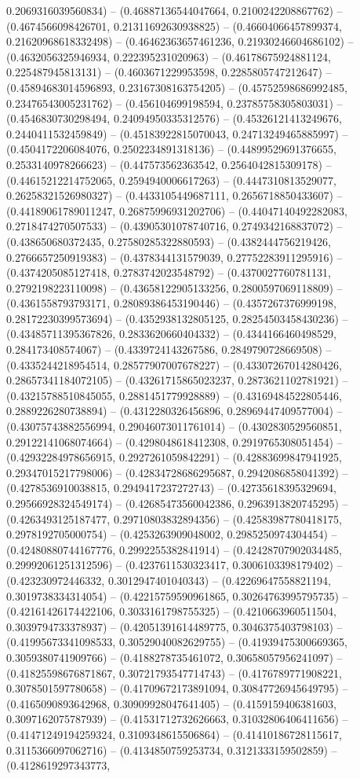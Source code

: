 0.2069316039560834) -- (0.46887136544047664, 0.2100242208867762) -- (0.4674566098426701, 0.21311692630938825) -- (0.46604066457899374, 0.21620968618332498) -- (0.46462363657461236, 0.21930246604686102) -- (0.4632056325946934, 0.222395231020963) -- (0.46178675924881124, 0.225487945813131) -- (0.4603671229953598, 0.2285805747212647) -- (0.45894683014596893, 0.23167308163754205) -- (0.45752598686992485, 0.23476543005231762) -- (0.456104699198594, 0.23785758305803031) -- (0.4546830730298494, 0.24094950335312576) -- (0.45326121413249676, 0.2440411532459849) -- (0.45183922815070043, 0.24713249465885997) -- (0.4504172206084076, 0.2502234891318136) -- (0.44899529691376655, 0.2533140978266623) -- (0.447573562363542, 0.2564042815309178) -- (0.44615212214752065, 0.2594940006617263) -- (0.4447310813529077, 0.26258321526980327) -- (0.4433105449687111, 0.2656718850433607) -- (0.44189061789011247, 0.26875996931202706) -- (0.44047140492282083, 0.2718474270507533) -- (0.43905301078740716, 0.2749342168837072) -- (0.438650680372435, 0.27580285322880593) -- (0.4382444756219426, 0.2766657250919383) -- (0.4378344131579039, 0.27752283911295916) -- (0.4374205085127418, 0.2783742023548792) -- (0.4370027760781131, 0.2792198223110098) -- (0.43658122905133256, 0.2800597069118809) -- (0.4361558793793171, 0.28089386453190446) -- (0.4357267376999198, 0.28172230399573694) -- (0.4352938132805125, 0.28254503458430236) -- (0.43485711395367826, 0.2833620660404332) -- (0.4344166460498529, 0.284173408574067) -- (0.4339724143267586, 0.2849790728669508) -- (0.4335244218954514, 0.28577907007678227) -- (0.43307267014280426, 0.28657341184072105) -- (0.43261715865023237, 0.2873621102781921) -- (0.43215788510845055, 0.2881451779928889) -- (0.43169484522805446, 0.2889226280738894) -- (0.4312280326456896, 0.28969447409577004) -- (0.43075743882556994, 0.29046073011761014) -- (0.4302830529560851, 0.29122141068074664) -- (0.4298048618412308, 0.2919765308051454) -- (0.42932284978656915, 0.2927261059842291) -- (0.42883699847941925, 0.29347015217798006) -- (0.42834728686295687, 0.2942086858041392) -- (0.4278536910038815, 0.2949417237272743) -- (0.42735618395329694, 0.29566928324549174) -- (0.42685473560042386, 0.2963913820745295) -- (0.4263493125187477, 0.29710803832894356) -- (0.42583987780418175, 0.2978192705000754) -- (0.4253263909048002, 0.2985250974304454) -- (0.42480880744167776, 0.2992255382841914) -- (0.42428707902034485, 0.29992061251312596) -- (0.4237611530323417, 0.3006103398179402) -- (0.423230972446332, 0.3012947401040343) -- (0.42269647558821194, 0.3019738334314054) -- (0.42215759590961865, 0.30264763995795735) -- (0.42161426174422106, 0.3033161798755325) -- (0.4210663960511504, 0.3039794733378937) -- (0.42051391614489775, 0.3046375403798103) -- (0.41995673341098533, 0.30529040082629755) -- (0.41939475300669365, 0.3059380741909766) -- (0.4188278735461072, 0.30658057956241097) -- (0.41825598676871867, 0.30721793547714743) -- (0.4176789771908221, 0.3078501597780658) -- (0.41709672173891094, 0.30847726945649795) -- (0.4165090893642968, 0.30909928047641405) -- (0.4159159406381603, 0.3097162075787939) -- (0.41531712732626663, 0.31032806406411656) -- (0.41471249194259324, 0.3109348615506864) -- (0.41410186728115617, 0.3115366097062716) -- (0.4134850759253734, 0.3121333159502859) -- (0.4128619297343773, 